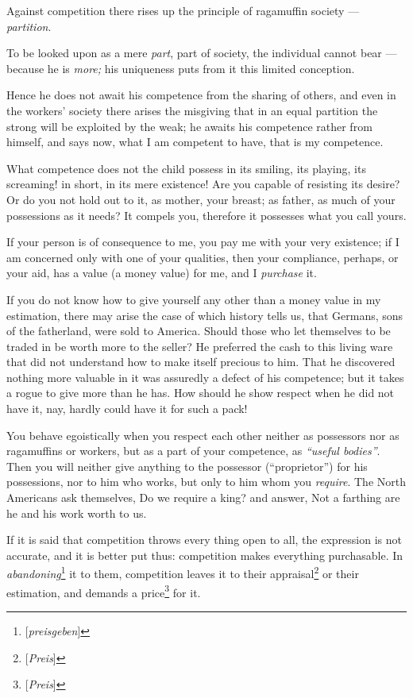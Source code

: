 Against competition there rises up the principle of ragamuffin society --- \textit{partition}.

To be looked upon as a mere \textit{part}, part of society, the individual 
cannot bear --- because he is \textit{more;} his uniqueness puts from it this 
limited conception.

Hence he does not await his competence from the sharing of others, and even in 
the workers' society there arises the misgiving that in an equal partition the 
strong will be exploited by the weak; he awaits his competence rather from 
himself, and says now, what I am competent to have, that is my competence.

What competence does not the child possess in its smiling, its playing, its 
screaming! in short, in its mere existence! Are you capable of resisting its 
desire? Or do you not hold out to it, as mother, your breast; as father, as 
much of your possessions as it needs? It compels you, therefore it possesses 
what you call yours.

If your person is of consequence to me, you pay me with your very existence; 
if I am concerned only with one of your qualities, then your compliance, 
perhaps, or your aid, has a value (a money value) for me, and I 
\textit{purchase} it.

If you do not know how to give yourself any other than a money value in my 
estimation, there may arise the case of which history tells us, that Germans, 
sons of the fatherland, were sold to America. Should those who let themselves 
to be traded in be worth more to the seller? He preferred the cash to this 
living ware that did not understand how to make itself precious to him. That 
he discovered nothing more valuable in it was assuredly a defect of his 
competence; but it takes a rogue to give more than he has. How should he show 
respect when he did not have it, nay, hardly could have it for such a pack!

You behave egoistically when you respect each other neither as possessors nor 
as ragamuffins or workers, but as a part of your competence, as 
\textit{``useful bodies''}. Then you will neither give anything to the 
possessor (``proprietor'') for his possessions, nor to him who works, but 
only to him whom you \textit{require}. The North Americans ask themselves, Do 
we require a king? and answer, Not a farthing are he and his work worth to us.

If it is said that competition throws every thing open to all, the expression 
is not accurate, and it is better put thus: competition makes everything 
purchasable. In \textit{abandoning}\footnote{[\textit{preisgeben}]} it to 
them, competition leaves it to their appraisal\footnote{[\textit{Preis}]} or 
their estimation, and demands a price\footnote{[\textit{Preis}]} for it.

